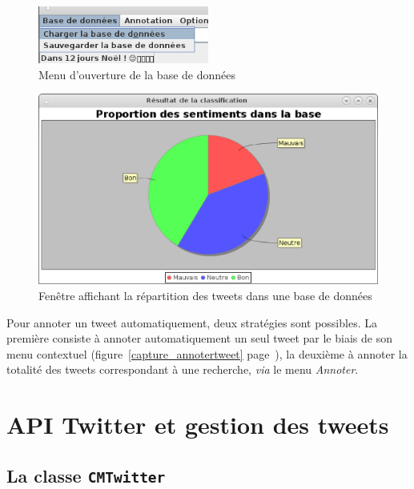 \documentclass[12pt,a4paper]{report}
\begin{document}
\begin{figure}
	\centering
	\includegraphics[width=0.5\textwidth]{img/chargerbdd.png}
	\caption{Menu d'ouverture de la base de données}
	\label{capture_ouvrir_base_de_donnees}
\end{figure}

\begin{figure}
	\centering
	\includegraphics[width=\textwidth]{img/resultats_classification_tweetsv6.eps}
	\caption{Fenêtre affichant la répartition des tweets dans une base de
	données}
	\label{capture_repartition_tweetsv6}
\end{figure}


Pour annoter un tweet automatiquement, deux stratégies sont possibles.
La première consiste à annoter automatiquement un seul tweet par le biais de son
menu contextuel (figure~\ref{capture_annotertweet}
page~\pageref{capture_annotertweet}), la deuxième à annoter la
totalité des tweets correspondant à une recherche, \textit{via} le menu
\textit{Annoter}.


\chapter{API Twitter et gestion des tweets}

\section{La classe \texttt{CMTwitter}}
\end{document}
